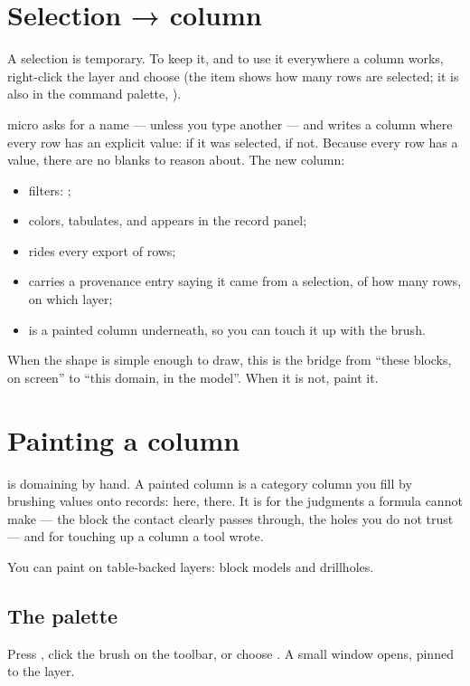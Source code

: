 \section{Selection → column}\label{sec:picking-selcol}
A selection is temporary. To keep it, and to use it everywhere a column works, right-click the layer and choose  (the item shows how many rows are selected; it is also in the command palette, ).

micro asks for a name —  unless you type another — and writes a column where every row has an explicit value:  if it was selected,  if not. Because every row has a value, there are no blanks to reason about. The new column:

\begin{itemize}
\item filters: ;
\item colors, tabulates, and appears in the record panel;
\item rides every export of rows;
\item carries a provenance entry saying it came from a selection, of how many rows, on which layer;
\item is a painted column underneath, so you can touch it up with the brush.
\end{itemize}

When the shape is simple enough to draw, this is the bridge from “these blocks, on screen” to “this domain, in the model”. When it is not, paint it.

\section{Painting a column}\label{sec:picking-paint}
 is domaining by hand. A painted column is a category column you fill by brushing values onto records:  here,  there. It is for the judgments a formula cannot make — the block the contact clearly passes through, the holes you do not trust — and for touching up a column a tool wrote.

You can paint on table-backed layers: block models and drillholes.

\subsection{The palette}
Press , click the brush on the toolbar, or choose . A small  window opens, pinned to the layer.

